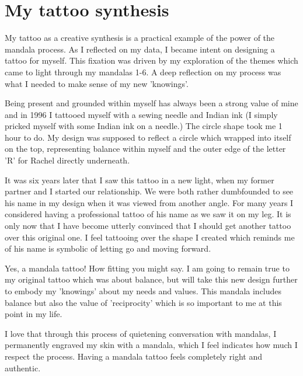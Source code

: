 \chapter{My tattoo synthesis }




My tattoo as a creative synthesis is a practical example of the power of the mandala process. As I reflected on my data, I became intent on designing a tattoo for myself. This fixation was driven by my exploration of the themes which came to light through my mandalas 1-6. A deep reflection on my process was what I needed to make sense of my new 'knowings'. 

Being present and grounded within myself has always been a strong value of mine and in 1996 I tattooed myself with a sewing needle and Indian ink (I simply pricked myself with some Indian ink on a needle.) The circle shape took me 1 hour to do. My design was supposed to reflect a circle which wrapped into itself on the top, representing balance within myself and the outer edge of the letter 'R' for Rachel directly underneath. 


It was six years later that I saw this tattoo in a new light, when my former partner and I started our relationship. We were both rather dumbfounded to see his name in my design when it was viewed from another angle. For many years I considered having a professional tattoo of his name as we saw it on my leg. It is only now that I have become utterly convinced that I should get another tattoo over this original one. I feel tattooing over the shape I created which reminds me of his name is symbolic of letting go and moving forward. 

Yes, a mandala tattoo! How fitting you might say. I am going to remain true to my original tattoo which was about balance, but will take this new design further to embody my 'knowings' about my needs and values. This mandala includes balance but also the value of 'reciprocity' which is so important to me at this point in my life. 

I love that through this process of quietening conversation with mandalas, I permanently engraved my skin with a mandala, which I feel indicates how much I respect the process. Having a mandala tattoo feels completely right and authentic.

